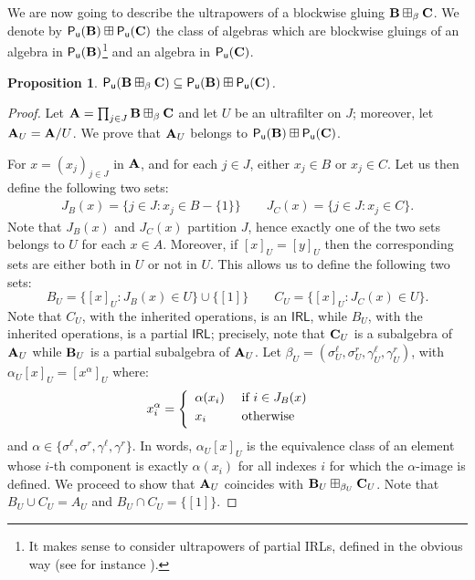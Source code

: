 \documentclass{amsart}
\newtheorem{proposition}[theorem]{Proposition}
\theoremstyle{definition}
\numberwithin{equation}{section}
\newcommand{\alg}[1]{{\textbf{\upshape #1}}}  %
\newcommand{\vv}[1]{\mathsf {#1}}
\newcommand{\sell}{\sigma^\ell}
\newcommand{\sr}{\sigma^r}
\newcommand{\gell}{\gamma^\ell}
\newcommand{\gr}{\gamma^r}
\begin{document}
We are now going to describe the ultrapowers of a blockwise gluing $\alg B \boxplus_\beta \alg C$.
We denote by $\vv{P_u}(\alg B)\boxplus \vv{P_u}(\alg C)$ the class of algebras which are blockwise gluings of an algebra in $\vv{P_u}(\alg B)$\footnote{It makes sense to consider ultrapowers of partial IRLs, defined in the obvious way (see for instance \cite{Burmeister}).} and an algebra in $\vv{P_u}(\alg C)$.
\begin{proposition}
	$\vv{P_u}(\alg B \boxplus_\beta \alg C)\subseteq \vv{P_u}(\alg B)\boxplus \vv{P_u}(\alg C)$.
\end{proposition}
\begin{proof}
	Let $\alg A = \prod_{j \in J} \alg B \boxplus_\beta \alg C$ and let $ U$ be an ultrafilter on $J$; moreover, let $\alg A_U=\alg A / U$. We prove that $\alg A_U$ belongs to $\vv{P_u}(\alg B)\boxplus \vv{P_u}(\alg C)$. 
	
	For $x=(x_j)_{j \in J}$ in $\alg A$, and for each $j \in J$, either $x_j \in B$ or $x_j \in C$. Let us then define the following two sets:
	\begin{align*}
		J_B(x)=\{ j \in J :  x_j \in B - \{1\}\} \qquad J_C(x)=\{ j \in J : x_j \in C \}.
	\end{align*}
	Note that $J_B(x)$ and $J_C(x)$ partition $J$, hence exactly one of the two sets belongs to $U$ for each $x \in A$. Moreover, if $[x]_U=[y]_U$ then the corresponding sets are either both in $U$ or not in $U$. This allows us to define the following two sets:
	$$
	B_U= \{[x]_U : J_B(x) \in U \}\cup \{[1]\} \qquad C_U=\{[x]_U : J_C(x)\in U \}.
	$$
	Note that $C_U$, with the inherited operations, is an $\vv{IRL}$, while $B_U$, with the inherited operations, is a partial $\vv{IRL}$; precisely, note that $\alg C_U$ is a subalgebra of $\alg A_U$ while $\alg B_U$ is a partial subalgebra of $\alg A_U$. Let $\beta_U=(\sell_U, \sr_U, \gell_U, \gr_U)$, with $\alpha_U[x]_U = [x^\alpha]_U$ where:
	\begin{align*}
	x^\alpha_i &= \left\{\begin{array}{ll}
\alpha(x_i) &\mbox{ if } i \in J_B(x) \vspace{0.1cm}\\
x_i &\mbox{ otherwise } \vspace{0.1cm}
\end{array}\right.
\end{align*}
and $\alpha \in \{\sell, \sr, \gell, \gr \}$. In words, $\alpha_U[x]_U$ is the equivalence class of an element whose $i$-th component is exactly $\alpha(x_i)$ for all indexes $i$ for which the $\alpha$-image is defined. We proceed to show that $\alg A_U$ coincides with $\alg B_U \boxplus_{\beta_U} \alg C_U$. Note that $B_U\cup C_U = A_U$ and $B_U \cap C_U = \{[1]\}$.


\end{proof}
\end{document}
